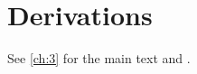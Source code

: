 \chapter{Derivations}\label{app:A}
\lipsum[107-108]

See \cref{ch:3} for the main text and \citep{appx-1}.
